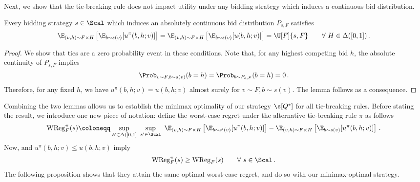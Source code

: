 Next, we show that the tie-breaking rule does not impact utility under any bidding strategy which induces a continuous bid distribution.

\begin{lemma}\label{lemma:tie-breaking-cont-strat}
    Every bidding strategy $s \in \Scal$ which induces an absolutely continuous bid distribution $P_{s,F}$ satisfies
    \begin{align*}
        \E_{(v,h) \sim F \times H}\left[ \E_{b \sim s(v)}[u^\pi(b,h;v)] \right] = \E_{(v,h) \sim F \times H}\left[ \E_{b \sim s(v)}[u(b,h;v)] \right] = \U[F]{s,F} \qquad \forall\ H \in \Delta([0,1])\,.
    \end{align*}
\end{lemma}
\begin{proof}
    We show that ties are a zero probability event in these conditions. Note that, for any highest competing bid $h$, the absolute continuity of $P_{s,F}$ implies
    \begin{align*}
        \Prob_{v \sim F, b \sim s(v)}(b = h) = \Prob_{b \sim P_{s,F}}(b = h) = 0\,.
    \end{align*}
    Therefore, for any fixed $h$, we have $u^\pi(b,h;v) = u(b,h;v)$ almost surely for $v \sim F, b \sim s(v)$. The lemma follows as a consequence.
\end{proof}

Combining the two lemmas allows us to establish the minimax optimality of our strategy $\s[Q^*]$ for all tie-breaking rules. Before stating the result, we introduce one new piece of notation: define the worst-case regret under the alternative tie-breaking rule $\pi$ as follows
\begin{align*}
    \mathrm{WReg}^\pi_F(s) \coloneqq \sup_{H \in \Delta([0,1]}\ \sup_{s' \in \Scal}\ \E_{(v,h) \sim F \times H}\left[ \E_{b \sim s'(v)}[u^\pi(b,h;v)] \right] - \E_{(v,h) \sim F \times H}\left[ \E_{b \sim s(v)}[u^\pi(b,h;v)] \right]\,.
\end{align*}
Now,  and $u^\pi(b,h;v) \leq u(b,h;v)$ imply
\begin{align}\label{eq:tie-breaking-wreg-ineq}
    \mathrm{WReg}^\pi_F(s) \geq \mathrm{WReg}_F(s) \qquad \forall\ s \in \Scal\,.
\end{align}
The following proposition shows that they attain the same optimal worst-case regret, and do so with our minimax-optimal strategy.

